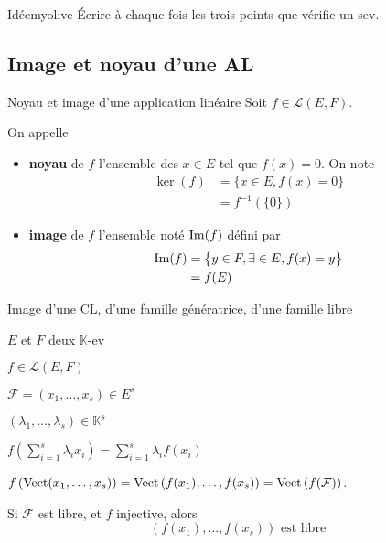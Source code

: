     \begin{demo}{Idée}{myolive}
        Écrire à chaque fois les trois points que vérifie un sev.
    \end{demo}

\subsection{Image et noyau d’une AL}

    \begin{defi}{Noyau et image d’une application linéaire}{}
        Soit $f \in \mathcal{L}(E,F)$.

        On appelle
        \begin{itemize}
            \item \textbf{noyau} de $f$ l’ensemble des $x \in E$ tel que $f(x) = 0$. On note 
            \begin{align*}
                \ker(f) &= \big\{ x \in E, f(x) = 0 \big\} \\
                &= f^{-1}\left(\{0\}\right)
            \end{align*}
            \item \textbf{image} de $f$ l’ensemble noté $\operatorname{Im}(f)$ défini par 
            \begin{align*}
                \operatorname{Im}(f) &= \big\{ y \in F, \exists \in E, f(x) = y \big\} \\
                &= f(E)
            \end{align*}
        \end{itemize}
    \end{defi}

    \begin{prop}{Image d’une CL, d’une famille génératrice, d’une famille libre}{}
        \begin{soient}
            \item $E$ et $F$ deux $\mathbb{K}$-ev
            \item $f \in \mathcal{L}(E,F)$
            \item $\mathcal{F} = (x_1, \ldots, x_s) \in E^s$
            \item $(\lambda_1, \ldots, \lambda_s) \in \mathbb{K}^s$
        \end{soient}
        \begin{alors}
            \item $f\left(\sum\limits_{i=1}^{s} \lambda_i x_i\right) = \sum\limits_{i=1}^{s} \lambda_i f(x_i)$
            \item $f \left( \operatorname{Vect}(x_1, \ldots, x_s) \right) = \operatorname{Vect} \left( f(x_1), \ldots, f(x_s) \right) = \operatorname{Vect}\left(f(\mathcal{F})\right)$.
            \item Si $\mathcal{F}$ est libre, et $f$ injective, alors 
            \[ (f(x_1), \ldots, f(x_s)) \text{ est libre} \] 
        \end{alors}
    \end{prop}

